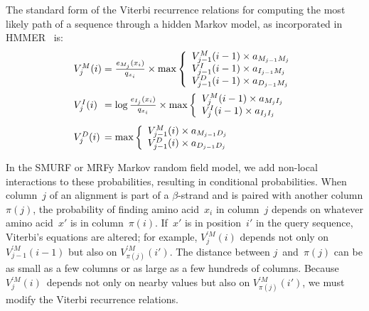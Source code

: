 \documentclass[blockstyle,times,preprint]{sigplanconf}
\begin{document}
The standard form of the Viterbi
recurrence relations for computing the most likely path of a sequence through
a hidden Markov model, as incorporated in HMMER~\cite{Eddy:1998ut} is:
\newcommand\txprobj[3][]{a#1_{{#2}_{j-1}{#3}_j}}
\newcommand\txprobjj[3][]{a#1_{{#2}_{j-1}{#3}_j}}
\newcommand\alignwidth{\ensuremath C} %
\newcommand\pairedwith[1]{{\pi(#1)}}
\newcommand\vsum[2]{#2&{}+{}& #1}
\def\goo{18pt}
\def\gum{14pt}
\def\maxiquad{\hskip 1.2em\relax}
\begin{equation*}
\begin{array}{@{}l@{}c@{}l}
V_{j}^{M}(i) &{}={}& \frac{e_{M_{j}}(x_{i})}{q_{x_{i}}} \times \max \left\{
  \begin{array}{l@{}c@{}l}
  V_{j-1}^{M}(i - 1) \times a_{M_{j-1}M_{j}}\\
  V_{j-1}^{I}(i - 1) \times a_{I_{j-1}M_{j}}\\
  V_{j-1}^{D}(i - 1) \times a_{D_{j-1}M_{j}}\\
  \end{array} \right.\\[\goo]
V_{j}^{I}(i) &=& \log\frac{e_{I_{j}}(x_{i})}{q_{x_{i}}} \times \max \left\{
  \begin{array}{l@{}c@{}l}
  V_{j}^{M}(i - 1) \times a_{M_{j}I_{j}}\\
  V_{j}^{I}(i - 1) \times a_{I_{j}I_{j}}\\
  \end{array} \right.\\[\gum]
V_{j}^{D}(i) &=& \max \left\{
  \begin{array}{l@{}c@{}l}
  V_{j-1}^{M}(i) \times a_{M_{j-1}D_{j}}\\
  V_{j-1}^{D}(i) \times a_{D_{j-1}D_{j}}\\
  \end{array} \right.\\
\end{array}
\end{equation*}

In the SMURF or MRFy Markov random field model, we add non-local interactions 
to these
probabilities, resulting in conditional probabilities.
When column~$j$ of an alignment is part of a $\beta$-strand and is paired
with another column  $\pairedwith j$,
the probability of finding amino acid~$x_i$ in column~$j$ 
depends on whatever amino acid~$x'$  is in column~${\pairedwith i}$.
If~$x'$ is in position~$i'$ in the query sequence, Viterbi's
equations are altered; for example,
$V_{j}^{\prime M}(i)$ depends not only on
$V_{j-1}^{\prime M}(i-1)$ but also on
$V_{\pairedwith j}^{\prime M}(i')$.
The distance between $j$~and~$\pairedwith j$ can be as small as a few
columns or as large as a few hundreds of columns.
Because $V_j^{\prime M}(i)$~depends not only on nearby values but also on
$V_{\pairedwith j}^{\prime M}(i')$,
we must modify the Viterbi recurrence relations.
\end{document}

